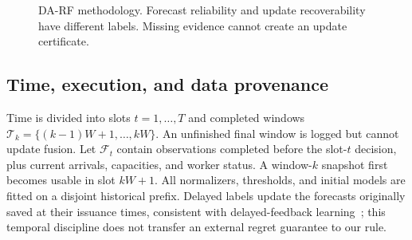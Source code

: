 \documentclass[10pt]{article}
\begin{document}
\begin{figure}[htbp]
\centering\small
{}
\caption{DA-RF methodology. Forecast reliability and update recoverability have
different labels. Missing evidence cannot create an update certificate.}
\label{fig:framework}
\end{figure}
\subsection{Time, execution, and data provenance}
\label{sec:problem}

Time is divided into slots $t=1,\ldots,T$ and completed windows
$\mathcal T_k=\{(k-1)W+1,\ldots,kW\}$. An unfinished final window is logged
but cannot update fusion. Let $\mathcal F_t$ contain observations completed
before the slot-$t$ decision, plus current arrivals, capacities, and worker
status. A window-$k$ snapshot first becomes usable in slot $kW+1$.
All normalizers, thresholds, and initial models are fitted on a disjoint
historical prefix. Delayed labels update the forecasts originally saved at
their issuance times, consistent with delayed-feedback
learning~\cite{joulani2013}; this temporal discipline does not transfer an
external regret guarantee to our rule.
\end{document}
